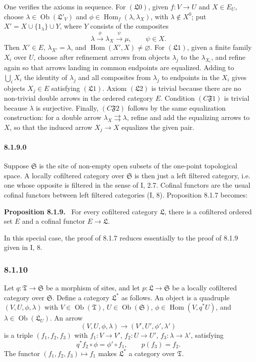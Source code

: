 \documentclass[11pt]{article}
\newcommand{\Hom}{\operatorname{Hom}}
\newcommand{\ob}{\operatorname{Ob}}
\newcommand{\Ss}{\mathfrak{S}}
\newcommand{\Tt}{\mathfrak{T}}
\newcommand{\Ll}{\mathfrak{L}}
\newenvironment{statement}[1]{\par\medskip\noindent\textbf{#1.}\ }{\par\medskip}
\begin{document}
One verifies the axioms in sequence. For $(\Ll0)$, given $f:V\to U$ and $X\in E_U$, choose $\lambda\in\ob(\Ll'_V)$ and $\phi\in\Hom_f(\lambda,\lambda_X)$, with $\lambda\notin X^0$; put $X'=X\cup\{1_\lambda\}\cup Y$, where $Y$ consists of the composites
\[
        \lambda\xrightarrow{\phi}\lambda_X\xrightarrow{\psi}\mu,
        \qquad \psi\in X.
\]
Then $X'\in E$, $\lambda_{X'}=\lambda$, and $\Hom(X',X)\neq\varnothing$. For $(\Ll1)$, given a finite family $X_i$ over $U$, choose after refinement arrows from objects $\lambda_j$ to the $\lambda_{X_i}$, and refine again so that arrows landing in common endpoints are equalized. Adding to $\bigcup_iX_i$ the identity of $\lambda_j$ and all composites from $\lambda_j$ to endpoints in the $X_i$ gives objects $X_j\in E$ satisfying $(\Ll1)$. Axiom $(\Ll2)$ is trivial because there are no non-trivial double arrows in the ordered category $E$. Condition $(C\mathfrak F1)$ is trivial because $\lambda$ is surjective. Finally, $(C\mathfrak F2)$ follows by the same equalization construction: for a double arrow $\lambda_X\rightrightarrows\lambda$, refine and add the equalizing arrows to $X$, so that the induced arrow $X_j\to X$ equalizes the given pair.

\paragraph*{8.1.9.0}
Suppose $\Ss$ is the site of non-empty open subsets of the one-point topological space. A locally cofiltered category over $\Ss$ is then just a left filtered category, i.e. one whose opposite is filtered in the sense of I, 2.7. Cofinal functors are the usual cofinal functors between left filtered categories (I, 8). Proposition 8.1.7 becomes:

\begin{statement}{Proposition 8.1.9}
For every cofiltered category $\Ll$, there is a cofiltered ordered set $E$ and a cofinal functor $E\to\Ll$.
\end{statement}

In this special case, the proof of 8.1.7 reduces essentially to the proof of 8.1.9 given in I, 8.

\subsubsection*{8.1.10}
Let $q:\Tt\to\Ss$ be a morphism of sites, and let $p:\Ll\to\Ss$ be a locally cofiltered category over $\Ss$. Define a category $\Ll^*$ as follows. An object is a quadruple $(V,U,\phi,\lambda)$ with $V\in\ob(\Tt)$, $U\in\ob(\Ss)$, $\phi\in\Hom(V,q^*U)$, and $\lambda\in\ob(\Ll_U)$. An arrow
\[
        (V,U,\phi,\lambda)\to(V',U',\phi',\lambda')
\]
is a triple $(f_1,f_2,f_3)$ with $f_1:V\to V'$, $f_2:U\to U'$, $f_3:\lambda\to\lambda'$, satisfying
\[
        q^*f_2\circ\phi=\phi'\circ f_1,
        \qquad p(f_3)=f_2.
\]
The functor $(f_1,f_2,f_3)\mapsto f_1$ makes $\Ll^*$ a category over $\Tt$.
\end{document}
